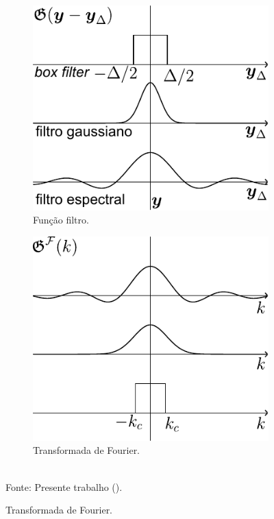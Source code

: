 \begin{figure}[h!]
    \centering
    \caption{Comportamento dos filtros apresentados na Tabela \ref{tab:filters}.}
    \begin{subfigure}{0.4\textwidth}
        \includegraphics[width=\linewidth]{Figuras/filtros1.pdf}
        \caption{Função filtro.}
    \end{subfigure}
    \begin{subfigure}{0.4\textwidth}
        \includegraphics[width=\linewidth]{Figuras/filtros2.pdf}
        \caption{Transformada de Fourier.}
    \end{subfigure}
    \\Fonte: Presente trabalho (\the\year).
    \label{fig:Filters}
\end{figure}

